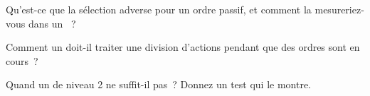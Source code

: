 \begin{interviewq}\label{iq:rs:event-driven-backtests:4}
Qu'est-ce que la sélection adverse pour un ordre passif, et comment la mesureriez-vous dans un ~?
\end{interviewq}

\begin{interviewq}\label{iq:rs:event-driven-backtests:5}
Comment un  doit-il traiter une division d'actions pendant que des ordres sont en cours~?
\end{interviewq}

\begin{interviewq}\label{iq:rs:event-driven-backtests:6}
Quand un  de niveau 2 ne suffit-il pas~? Donnez un test qui le montre.
\end{interviewq}
